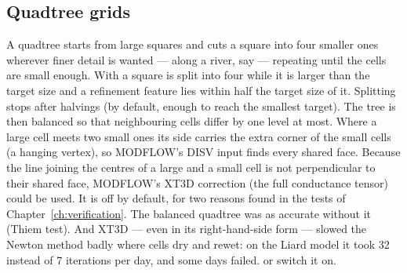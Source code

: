 \subsection{Quadtree grids}
A quadtree starts from large squares and cuts a square into four smaller ones wherever finer detail is wanted --- along a
river, say --- repeating until the cells are small enough. With  a square is split into four while it is larger than the target size and a refinement feature
lies within half the target size of it. Splitting stops after  halvings (by default, enough to
reach the smallest target). The tree is then balanced so that neighbouring cells differ by one level at most. Where a large cell meets two
small ones its side carries the extra corner of the small cells (a hanging vertex), so MODFLOW's DISV input finds every
shared face. Because the line joining the centres of a large and a small cell is not perpendicular to their shared face,
MODFLOW's XT3D correction (the full conductance tensor) could be used. It is off by default, for two reasons found in the tests of Chapter~\ref{ch:verification}. The balanced quadtree was as
accurate without it (Thiem test). And XT3D --- even in its right-hand-side form --- slowed the Newton method badly where cells
dry and rewet: on the Liard model it took 32 instead of 7 iterations per day, and some days failed.  or  switch it on.

